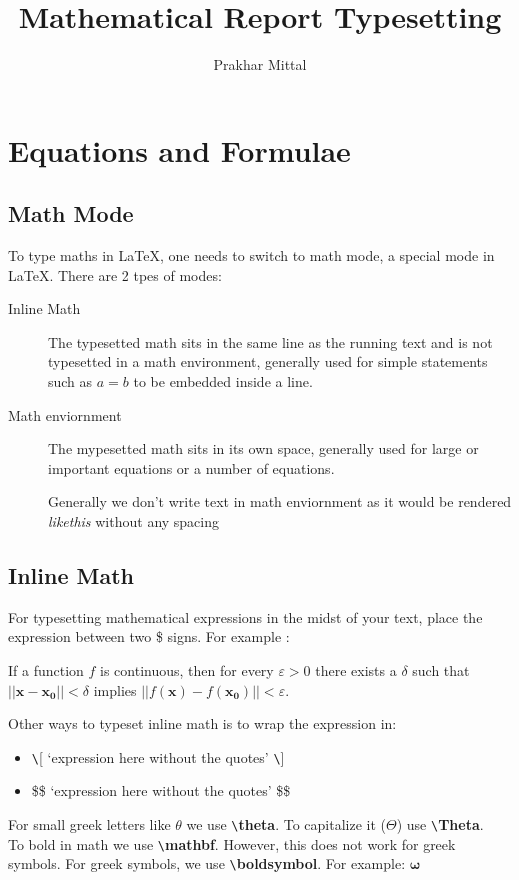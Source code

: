 \documentclass{article}
\title{Mathematical Report Typesetting}
\author{Prakhar Mittal}
\theoremstyle{remark}
\begin{document}
\maketitle
\tableofcontents
\clearpage

\section{Equations and Formulae}
    \subsection{Math Mode}
    To type maths in \LaTeX{}, one needs to switch to math mode, a special mode in \LaTeX.
    There are 2 tpes of modes: 

    \begin{description}
        \item[Inline Math] The typesetted math sits in the same line as the running text
        and is not typesetted in a math environment, generally used for simple statements
        such as $a=b$ to be embedded inside a line.
        \item[Math enviornment] The mypesetted math sits in its own space,
        generally used for large or important equations or a number of equations.
        
        Generally we don't write text in math enviornment as it would be rendered \textit{likethis}
        without any spacing
    \end{description}

    \subsection{Inline Math}
    For typesetting mathematical expressions in the midst of your text,
    place the expression between two \$ signs. For example :

    If a function $f$ is continuous, then for every $\varepsilon > 0$ there 
    exists a $\delta$ such that $||\mathbf{x}-\mathbf{x_0}|| < \delta$ implies
    $||f(\mathbf{x})-f(\mathbf{x_0})|| < \varepsilon$.\footnotemark

    Other ways to typeset inline math is to wrap the expression in:
    \begin{itemize}
        \item \verb!\![  `expression here without the quotes' \verb!\!]
        \item \$\$ `expression here without the quotes' \$\$
    \end{itemize}  
    For small greek letters like $\theta$ we use \verb!\!\textbf{theta}. To capitalize it ($\Theta$) use \verb!\!\textbf{Theta}. \\
    To bold in math we use \verb!\!\textbf{mathbf}. However, this does not work for greek symbols.
    For greek symbols, we use \verb!\!\textbf{boldsymbol}. For example: $\boldsymbol{\omega}$ 
\end{document}
